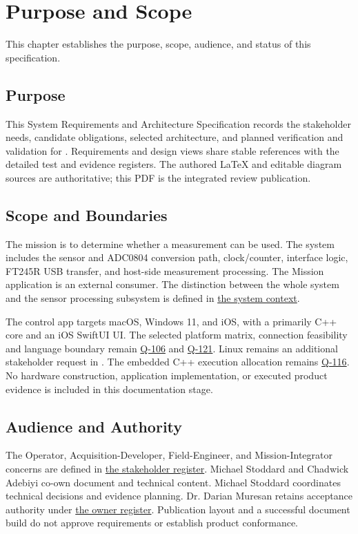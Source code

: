 \chapter{Purpose and Scope}
\label{Section:IntroductionResponsibility}
This chapter establishes the purpose, scope, audience, and status of this specification.
%


\section{Purpose}
This System Requirements and Architecture Specification records the
stakeholder needs, candidate obligations, selected architecture, and planned
verification and validation for \ProjectName. Requirements and design views
share stable references with the detailed test and evidence registers.
The authored LaTeX and editable diagram sources are authoritative; this PDF
is the integrated review publication.

\section{Scope and Boundaries}
The mission is to determine whether a measurement can be used. The system
includes the sensor and ADC0804 conversion path, clock/counter, interface
logic, FT245R USB transfer, and host-side measurement processing. The
Mission application is an external consumer. The distinction between the
whole system and the sensor processing subsystem is defined in
\hyperref[Section:MeasurementMission]{the system context}.

The control app targets macOS, Windows 11, and iOS, with a primarily C++ core and an iOS SwiftUI UI. The selected platform matrix, connection feasibility and language boundary remain \hyperref[Question:Q-106]{Q-106} and \hyperref[Question:Q-121]{Q-121}. Linux remains an additional stakeholder request in . The embedded C++ execution allocation remains \hyperref[Question:Q-116]{Q-116}.
No hardware construction, application implementation, or executed product
evidence is included in this documentation stage.

\section{Audience and Authority}
The Operator, Acquisition-Developer, Field-Engineer, and Mission-Integrator
concerns are defined in \hyperref[Table:StakeholderNeeds]{the stakeholder
register}. Michael Stoddard and Chadwick Adebiyi co-own document and technical content. Michael Stoddard coordinates technical decisions and evidence
planning. Dr. Darian Muresan retains acceptance authority under
\hyperref[Table:ProjectOwners]{the owner register}. Publication layout and a
successful document build do not approve requirements or establish product
conformance.

